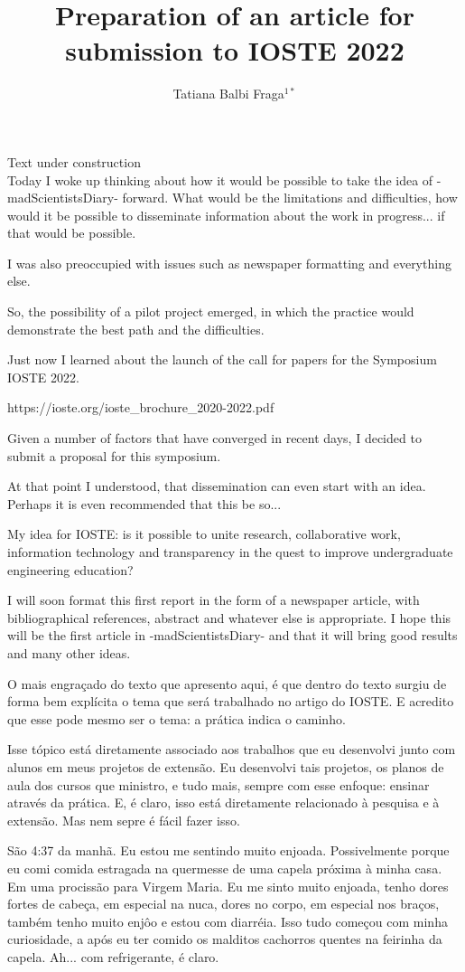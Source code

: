 \documentclass{book}
\title{Preparation of an article for submission to IOSTE 2022}
\author{Tatiana Balbi Fraga$^{1*}$}
\begin{document}
Text under construction \\

Today I woke up thinking about how it would be possible to take the idea of -madScientistsDiary- forward. What would be the limitations and difficulties, how would it be possible to disseminate information about the work in progress... if that would be possible.

I was also preoccupied with issues such as newspaper formatting and everything else.

So, the possibility of a pilot project emerged, in which the practice would demonstrate the best path and the difficulties.

Just now I learned about the launch of the call for papers for the Symposium IOSTE 2022.

https://ioste.org/ioste\_brochure\_2020-2022.pdf

Given a number of factors that have converged in recent days, I decided to submit a proposal for this symposium.

At that point I understood, that dissemination can even start with an idea. Perhaps it is even recommended that this be so...

My idea for IOSTE: is it possible to unite research, collaborative work, information technology and transparency in the quest to improve undergraduate engineering education?

I will soon format this first report in the form of a newspaper article, with bibliographical references, abstract and whatever else is appropriate. I hope this will be the first article in -madScientistsDiary- and that it will bring good results and many other ideas.

O mais engraçado do texto que apresento aqui, é que dentro do texto surgiu de forma bem explícita o tema que será trabalhado no artigo do IOSTE. E acredito que esse pode mesmo ser o tema: a prática indica o caminho. 

Isse tópico está diretamente associado aos trabalhos que eu desenvolvi junto com alunos em meus projetos de extensão. Eu desenvolvi tais projetos, os planos de aula dos cursos que ministro, e tudo mais, sempre com esse enfoque: ensinar através da prática. E, é claro, isso está diretamente relacionado à pesquisa e à extensão. Mas nem sepre é fácil fazer isso. 

São 4:37 da manhã. Eu estou me sentindo muito enjoada. Possivelmente porque eu comi comida estragada na quermesse de uma capela próxima à minha casa. Em uma procissão para Virgem Maria. Eu me sinto muito enjoada, tenho dores fortes de cabeça, em especial na nuca, dores no corpo, em especial nos braços, também tenho muito enjôo e estou com diarréia. Isso tudo começou com minha curiosidade, a após eu ter comido os malditos cachorros quentes na feirinha da capela. Ah... com refrigerante, é claro. 
\end{document}
